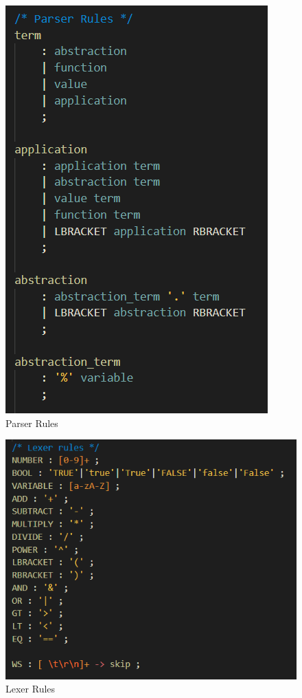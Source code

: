 \documentclass[a4paper,11pt]{report}
\begin{document}
\begin{figure}[p]
\centering
\includegraphics[scale=0.75]{images/parser_rules}
\caption{Parser Rules}
\label{parser_rules}
\end{figure}

\begin{figure}[p]
\centering
\includegraphics[scale=0.75]{images/lexer_rules}
\caption{Lexer Rules}
\label{lexer_rules}
\end{figure}
\end{document}
